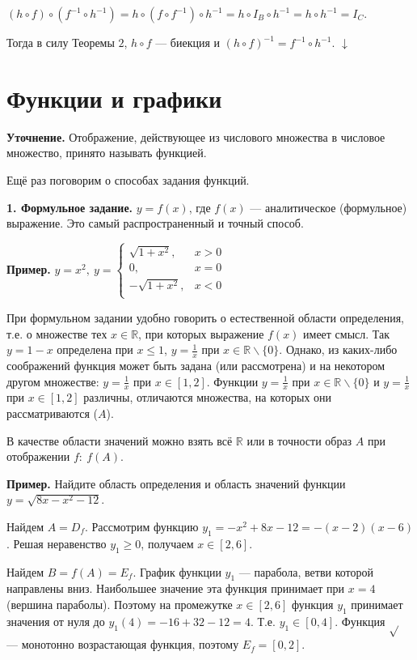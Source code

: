 \documentclass{article}
\begin{document}
    $(h \circ f) \circ (f^{-1} \circ h^{-1}) = h \circ (f \circ f^{-1}) \circ h^{-1} = h \circ I_B \circ h^{-1} = h \circ h^{-1} = I_C$.

    Тогда в силу Теоремы $2$, $h \circ f$ --- биекция и $(h \circ f)^{-1} = f^{-1} \circ h^{-1}$. $\downarrow$

    \section{Функции и графики}

    \textbf{Уточнение.} Отображение, действующее из числового множества в числовое множество, принято называть функцией.
    
    Ещё раз поговорим о способах задания функций.

    \textbf{1. Формульное задание.} $y = f(x)$, где $f(x)$ --- аналитическое (формульное) выражение. Это самый распространенный и точный способ.

    \textbf{Пример.} $y = x^2,\ y = \begin{cases}
        \sqrt{1 + x^2}, & x > 0\\
        0, & x = 0\\
        -\sqrt{1 + x^2}, & x < 0\\
    \end{cases}$

    При формульном задании удобно говорить о естественной области определения, т.е. о множестве тех $x \in \mathbb{R}$, при которых выражение $f(x)$ имеет смысл. Так $y = 1− x$ определена при $x \leq 1$, $y = \frac{1}{x}$ при $x \in \mathbb{R} \backslash \{0\}$. Однако, из каких-либо соображений функция может быть задана (или рассмотрена) и на некотором другом множестве: $y = \frac{1}{x}$ при $x \in [1, 2]$. Функции $y = \frac{1}{x}$ при $x \in \mathbb{R} \backslash \{0\}$ и $y = \frac{1}{x}$ при $x \in [1, 2]$ различны, отличаются множества, на которых они рассматриваются ($A$).

    В качестве области значений можно взять всё $\mathbb{R}$ или в точности образ $A$ при отображении $f:\ f(A)$.

    \textbf{Пример.} Найдите область определения и область значений функции $y = \sqrt{8x - x^2 - 12}$.

    Найдем $A = D_f$. Рассмотрим функцию $y_1 = -x^2 + 8x - 12 = -(x - 2)(x - 6)$. Решая неравенство $y_1 \geq 0$, получаем $x \in [2, 6]$.

    Найдем $B = f(A) = E_f$. График функции $y_1$ --- парабола, ветви которой направлены вниз. Наибольшее значение эта функция принимает при $x = 4$ (вершина параболы). Поэтому на промежутке $x \in [2, 6]$ функция $y_1$ принимает значения от нуля до $y_1(4) = -16 + 32 - 12 = 4$. Т.е. $y_1 \in [0, 4]$. Функция $\sqrt{}$ --- монотонно возрастающая функция, поэтому $E_f = [0, 2]$.
    
\end{document}
